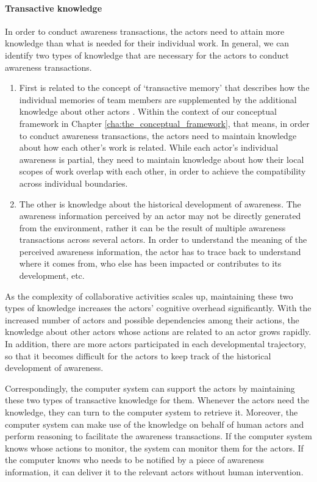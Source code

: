 \paragraph*{Transactive knowledge} %
\label{par:transactive_knowledge}
In order to conduct awareness transactions, the actors need to attain more knowledge than what is needed for their individual work. In general, we can identify two types of knowledge that are necessary for the actors to conduct awareness transactions.
\begin{enumerate}
   \item First is related to the concept of `transactive memory' that describes how the individual memories of team members are supplemented by the additional knowledge about other actors \cite{wegner1987transactive}. Within the context of our conceptual framework in Chapter \ref{cha:the_conceptual_framework}, that means, in order to conduct awareness transactions, the actors need to maintain knowledge about how each other's work is related. While each actor's individual awareness is partial, they need to maintain knowledge about how their local scopes of work overlap with each other, in order to achieve the compatibility across individual boundaries.  
   \item The other is knowledge about the historical development of awareness. The awareness information perceived by an actor may not be directly generated from the environment, rather it can be the result of multiple awareness transactions across several actors. In order to understand the meaning of the perceived awareness information, the actor has to trace back to understand where it comes from, who else has been impacted or contributes to its development, etc.
\end{enumerate}

As the complexity of collaborative activities scales up, maintaining these two types of knowledge increases the actors' cognitive overhead significantly. With the increased number of actors and possible dependencies among their actions, the knowledge about other actors whose actions are related to an actor grows rapidly. In addition, there are more actors participated in each developmental trajectory, so that it becomes difficult for the actors to keep track of the historical development of awareness.

Correspondingly, the computer system can support the actors by maintaining these two types of transactive knowledge for them. Whenever the actors need the knowledge, they can turn to the computer system to retrieve it. Moreover, the computer system can make use of the knowledge on behalf of human actors and perform reasoning to facilitate the awareness transactions. If the computer system knows whose actions to monitor, the system can monitor them for the actors. If the computer knows who needs to be notified by a piece of awareness information, it can deliver it to the relevant actors without human intervention.

